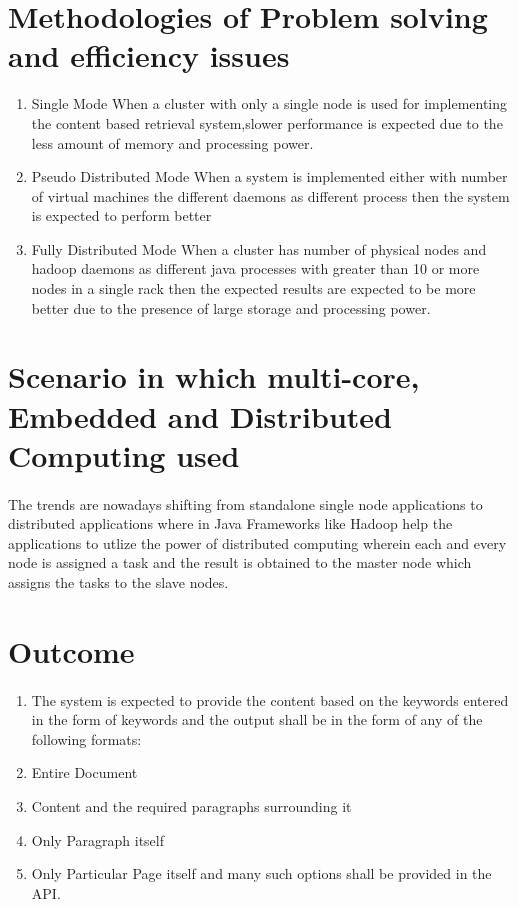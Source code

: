 \documentclass[oneside,a4paper,12pt]{report}
\begin{document}
\section{Methodologies of Problem solving and efficiency issues}
\begin{enumerate}
\item Single Mode
When a cluster with only a single node is used for implementing the content based retrieval system,slower performance is expected due to the less amount of memory and processing power.

\item Pseudo Distributed Mode
When a system is implemented either with number of virtual machines the different daemons as different process then the system is expected to perform better 

\item Fully Distributed Mode
When a cluster has number of physical nodes and hadoop daemons as different java processes with greater than 10 or more nodes in a single rack then the expected results are expected to be more better due to the presence of large storage and processing power.
\end{enumerate}

\section{Scenario in which multi-core, Embedded and Distributed Computing used}
\paragraph{}
The trends are nowadays shifting from standalone single node applications to distributed applications where in Java Frameworks like Hadoop help the applications to utlize the power of distributed computing wherein each and every node is assigned a task and the result is obtained to the master node which assigns the tasks to the slave nodes.

\section{Outcome}
\paragraph{}
\begin{enumerate}
\item The system is expected to provide the content based on the keywords entered in the form of keywords and the output shall be in the form of any of the following formats:
\item Entire Document
\item Content and the required paragraphs surrounding it
\item Only Paragraph itself 
\item Only Particular Page itself
and many such options shall be provided in the API.
\end{enumerate}
\end{document}
